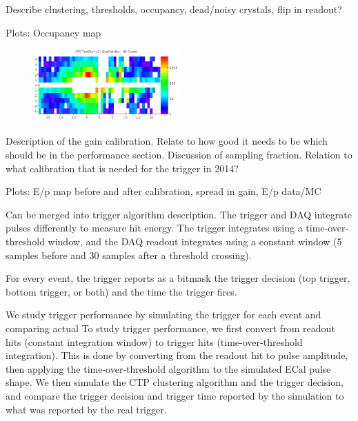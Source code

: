 
\vspace{1cm}{\bf ECal performance [Sho]}

Describe clustering, thresholds, occupancy, dead/noisy crystals, flip in readout?

Plots: Occupancy map

\begin{figure}[ht]
	\includegraphics[width=0.5\textwidth]{test2012/ecalperformance/hitrates}
	\caption{\small{}}
	\label{fig:hitrates}
\end{figure}

\vspace{1cm}{\bf ECal Calibration [Sho]}


Description of the gain calibration. Relate to how good it needs to be which should be in the performance section. Discussion of sampling fraction. Relation to what calibration that is needed for the trigger in 2014?

Plots: E/p map before and after calibration, spread in gain, E/p data/MC


\vspace{1cm}{\bf Trigger performance [Sho/Ben]}


{\color{red} Can be merged into trigger algorithm description.} The trigger and DAQ integrate pulses differently to measure hit energy. The trigger integrates using a time-over-threshold window, and the DAQ readout integrates using a constant window (5 samples before and 30 samples after a threshold crossing). 

For every event, the trigger reports as a bitmask the trigger decision (top trigger, bottom trigger, or both) and the time the trigger fires.

We study trigger performance by simulating the trigger for each event and comparing actual To study trigger performance, we first convert from readout hits (constant integration window) to trigger hits (time-over-threshold integration). 
This is done by converting from the readout hit to pulse amplitude, then applying the time-over-threshold algorithm to the simulated ECal pulse shape. 
We then simulate the CTP clustering algorithm and the trigger decision, and compare the trigger decision and trigger time reported by the simulation to what was reported by the real trigger.


